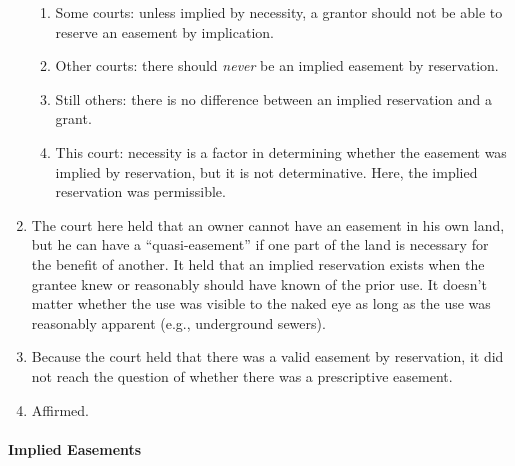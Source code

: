 \begin{enumerate}
\begin{enumerate}
        \item Some courts: unless implied by necessity, a grantor should not 
        be able to reserve an easement by implication.
        \item Other courts: there should \emph{never} be an implied easement 
        by reservation.
        \item Still others: there is no difference between an implied 
        reservation and a grant.
        \item This court: necessity is a factor in determining whether the 
        easement was implied by reservation, but it is not determinative. 
        Here, the implied reservation was permissible.
    \end{enumerate}
    \item The court here held that an owner cannot have an easement in his 
    own land, but he can have a ``quasi-easement'' if one part of the land is 
    necessary for the benefit of another. It held that an implied reservation 
    exists when the grantee knew or reasonably should have known of the prior 
    use. It doesn't matter whether the use was visible to the naked eye as 
    long as the use was reasonably apparent (e.g., underground sewers).
    \item Because the court held that there was a valid easement by 
    reservation, it did not reach the question of whether there was a 
    prescriptive easement.
    \item Affirmed.
\end{enumerate}

\paragraph{Implied Easements}


